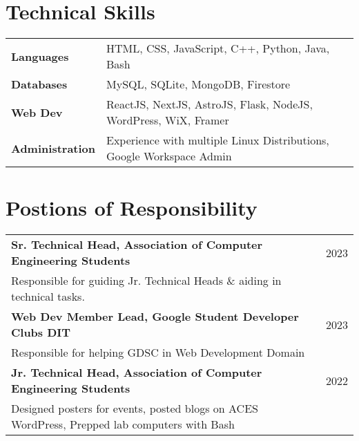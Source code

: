 \documentclass[a4paper,10pt]{article}
\begin{document}
\section{Technical Skills}
\begin{tabularx}{\linewidth}{@{}l X@{}}
\textbf{Languages} &  \normalsize{HTML, CSS, JavaScript, C++, Python, Java, Bash}\\
\textbf{Databases} &  \normalsize{MySQL, SQLite, MongoDB, Firestore}\\
\textbf{Web Dev}  &  \normalsize{ReactJS, NextJS, AstroJS, Flask, NodeJS, WordPress, WiX, Framer}\\
\textbf{Administration} & \normalsize{Experience with multiple Linux Distributions, Google Workspace Admin}\\
\end{tabularx}

\section{Postions of Responsibility}

\begin{tabularx}{\linewidth}{@{}l X@{}}	

\textbf{Sr. Technical Head, Association of Computer Engineering Students} & \hfill 
2023 \\ \vspace*{1mm}
Responsible for guiding Jr. Technical Heads \& aiding in technical tasks. \\ 

\textbf{Web Dev Member Lead, Google Student Developer Clubs DIT} & \hfill 
2023 \\ \vspace*{1mm}
Responsible for helping GDSC in Web Development Domain \\ 

\textbf{Jr. Technical Head, Association of Computer Engineering Students} & \hfill 
2022 \\ 
Designed posters for events, posted blogs on ACES WordPress, Prepped lab computers with Bash\\ 

\end{tabularx}
\end{document}
